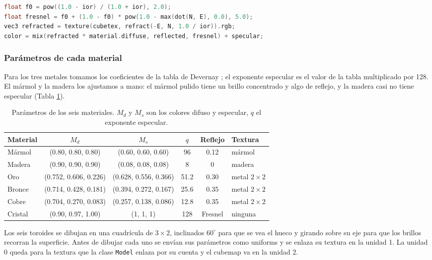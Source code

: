 \begin{lstlisting}[language=C, caption={Mezcla de reflexión y refracción para el cristal.}, label={lst:act4_cristal}]
float f0 = pow((1.0 - ior) / (1.0 + ior), 2.0);
float fresnel = f0 + (1.0 - f0) * pow(1.0 - max(dot(N, E), 0.0), 5.0);
vec3 refracted = texture(cubetex, refract(-E, N, 1.0 / ior)).rgb;
color = mix(refracted * material.diffuse, reflected, fresnel) + specular;
\end{lstlisting}

\subsubsection{Parámetros de cada material}

Para los tres metales tomamos los coeficientes de la tabla de Devernay \cite{devernay_materials}; el exponente especular es el valor de la tabla multiplicado por 128. El mármol y la madera los ajustamos a mano: el mármol pulido tiene un brillo concentrado y algo de reflejo, y la madera casi no tiene especular (Tabla \ref{tab:act4_materiales}).

\begin{table}[H]
\centering
\small
\begin{tabular}{|l|c|c|c|c|l|}
\hline
\textbf{Material} & \textbf{$M_d$} & \textbf{$M_s$} & \textbf{$q$} & \textbf{Reflejo} & \textbf{Textura} \\ \hline
Mármol & (0.80, 0.80, 0.80) & (0.60, 0.60, 0.60) & 96 & 0.12 & mármol \\ \hline
Madera & (0.90, 0.90, 0.90) & (0.08, 0.08, 0.08) & 8 & 0 & madera \\ \hline
Oro & (0.752, 0.606, 0.226) & (0.628, 0.556, 0.366) & 51.2 & 0.30 & metal $2\times2$ \\ \hline
Bronce & (0.714, 0.428, 0.181) & (0.394, 0.272, 0.167) & 25.6 & 0.35 & metal $2\times2$ \\ \hline
Cobre & (0.704, 0.270, 0.083) & (0.257, 0.138, 0.086) & 12.8 & 0.35 & metal $2\times2$ \\ \hline
Cristal & (0.90, 0.97, 1.00) & (1, 1, 1) & 128 & Fresnel & ninguna \\ \hline
\end{tabular}
\caption{Parámetros de los seis materiales. $M_d$ y $M_s$ son los colores difuso y especular, $q$ el exponente especular.}
\label{tab:act4_materiales}
\end{table}

Los seis toroides se dibujan en una cuadrícula de $3\times2$, inclinados $60^\circ$ para que se vea el hueco y girando sobre su eje para que los brillos recorran la superficie. Antes de dibujar cada uno se envían sus parámetros como uniforms y se enlaza su textura en la unidad 1. La unidad 0 queda para la textura que la clase \texttt{Model} enlaza por su cuenta y el cubemap va en la unidad 2.

